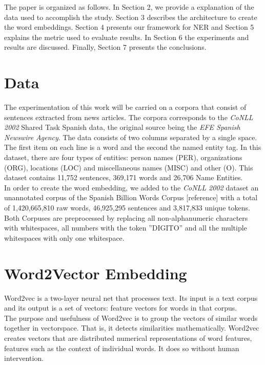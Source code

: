 \documentclass[]{article}
\begin{document}
The paper is organized as follows. In Section 2, we provide a explanation of the data used to accomplish the study. Section 3 describes the architecture to create the word embeddings. Section 4 presents our framework for NER and Section 5 explains the metric used to evaluate results. In Section 6 the experiments and results are discussed.  Finally, Section 7 presents the conclusions.

\section{Data}
  The experimentation of this work will be carried on a corpora that consist of sentences extracted from news articles. The corpora corresponds to the \emph{CoNLL 2002} Shared Task Spanish data, the original source being the \emph{EFE Spanish Newswire Agency}.  The data consists of two columns separated by a single space. The first item on each line is a word and the second the named entity tag. In this dataset, there are four types of entities: person names (PER), organizations (ORG), locations (LOC) and miscellaneous names (MISC) and other (O). This dataset contains 11,752 sentences, 369,171 words and 26,706 Name Entities.  \\
  
  In order to create the word embedding, we added to the \emph{CoNLL 2002} dataset an unannotated corpus of the Spanish Billion Words Corpus [reference] with a total of 1,420,665,810 raw words,  46,925,295 sentences and 3,817,833 unique tokens. Both Corpuses are preprocessed by replacing all non-alphanumeric characters with whitespaces, all numbers with the token ''DIGITO'' and all the multiple whitespaces with only one whitespace. \\
  
  

\section{Word2Vector Embedding}

Word2vec is a two-layer neural net that processes text. Its input is a text corpus and its output is a set of vectors: feature vectors for words in that corpus. \\ 

The purpose and usefulness of Word2vec is to group the vectors of similar words together in vectorspace. That is, it detects similarities mathematically. Word2vec creates vectors that are distributed numerical representations of word features, features such as the context of individual words. It does so without human intervention. \\
\end{document}
